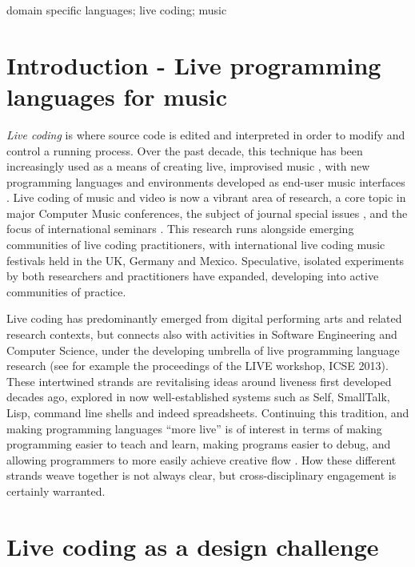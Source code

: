 \documentclass[authoryear,preprint]{sigplanconf}
\begin{document}
\keywords
domain specific languages; live coding; music

\section{Introduction - Live programming languages for music}

\emph{Live coding} is where source code is edited and interpreted in
order to modify and control a running process. Over the past decade,
this technique has been increasingly used as a means of creating live,
improvised music \citep{Collins03a}, with new programming languages
and environments developed as end-user music interfaces
\citep[e.g.][]{Wang04, Sorensen05, Aaron11, McLean10c}. Live coding of
music and video is now a vibrant area of research, a core topic in
major Computer Music conferences, the subject of journal special
issues \cite{McLean14}, and the focus of international seminars
\citep{Blackwell14}. This research runs alongside emerging communities
of live coding practitioners, with international live coding music
festivals held in the UK, Germany and Mexico. Speculative, isolated
experiments by both researchers and practitioners have expanded,
developing into active communities of practice.

Live coding has predominantly emerged from digital performing arts and
related research contexts, but connects also with activities in
Software Engineering and Computer Science, under the developing
umbrella of live programming language research (see for example the
proceedings of the LIVE workshop, ICSE 2013). These intertwined
strands are revitalising ideas around liveness first developed decades
ago, explored in now well-established systems such as Self, SmallTalk,
Lisp, command line shells and indeed spreadsheets. Continuing this
tradition, and making programming languages ``more live'' is of
interest in terms of making programming easier to teach and learn,
making programs easier to debug, and allowing programmers to more
easily achieve creative flow \citep{Blackwell14}. How these different
strands weave together is not always clear, but cross-disciplinary
engagement is certainly warranted.

\section{Live coding as a design challenge}
\end{document}
